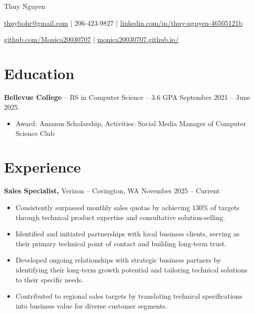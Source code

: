\documentclass[11pt]{article}       %
\begin{document}
\centerline{\Huge Thuy Nguyen}

\vspace{5pt}

\centerline{\href{mailto:thuybohr@gmail.com}{thuybohr@gmail.com} | 206-423-9827 |
\href{https://www.linkedin.com/in/thuy-nguyen-46505121b/}{linkedin.com/in/thuy-nguyen-46505121b}}

\centerline{\href{https://github.com/Monica20030707}{github.com/Monica20030707} | 
\href{https://monica20030707.github.io/}{monica20030707.github.io/}} 

\vspace{-9pt}

\section*{Education}
\textbf{Bellevue College} -- BS in Computer Science -- 3.6 GPA \hfill September 2021 -- June 2025\\
\vspace{-9pt}
\begin{itemize}
  \item Award: Amazon Scholarship, Activities: Social Media Manager of Computer Science Club
\end{itemize}

\vspace{-18.5pt}

\section*{Experience}

\textbf{Sales Specialist,} {Verizon} -- Covington, WA \hfill November 2025 -- Current \\
\vspace{-9pt}
\begin{itemize}
  \item Consistently surpassed monthly sales quotas by achieving 130\% of targets through technical product expertise and consultative solution-selling.
  \item Identified and initiated partnerships with local business clients, serving as their primary technical point of contact and building long-term trust.
  \item Developed ongoing relationships with strategic business partners by identifying their long-term growth potential and tailoring technical solutions to their specific needs.
  \item Contributed to regional sales targets by translating technical specifications into business value for diverse customer segments.
\end{itemize}
\end{document}
